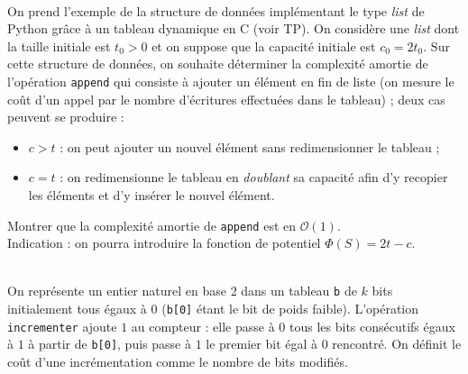 \documentclass[11pt,a4paper]{article}
\begin{document}
\begin{Exercise}[title={Un exemple de complexité amortie}]\\
On prend l'exemple de la structure de données implémentant le type \textit{list} de Python grâce à un tableau dynamique en C (voir TP). On considère une \textit{list} dont la taille initiale est $t_0 > 0$ et on suppose que la capacité initiale est $c_0 = 2t_0$. Sur cette structure de données, on souhaite déterminer la complexité amortie de l'opération {\tt append} qui consiste à ajouter un élément en fin de liste (on mesure le coût d'un appel par le nombre d'écritures effectuées dans le tableau) ; deux cas peuvent se produire :
\begin{itemize}
\item[\textbullet] $c > t$ : on peut ajouter un nouvel élément sans redimensionner le tableau ;
\item[\textbullet] $c = t$ : on redimensionne le tableau en \textit{doublant} sa capacité afin d'y recopier les éléments et d'y insérer le nouvel élément.
\end{itemize}
Montrer que la complexité amortie de {\tt append} est en $\mathcal{O}(1)$. \\
{\small \aide \;} Indication : on pourra introduire la fonction de potentiel $\Phi(S) = 2t - c$.
\end{Exercise}

\begin{Exercise}[title={Complexité amortie d'un compteur binaire}]\\
    On représente un entier naturel en base $2$ dans un tableau {\tt b} de $k$ bits initialement tous égaux à $0$ ({\tt b[0]} étant le bit de poids faible). L'opération {\tt incrementer} ajoute $1$ au compteur : elle passe à $0$ tous les bits consécutifs égaux à $1$ à partir de {\tt b[0]}, puis passe à $1$ le premier bit égal à $0$ rencontré. On définit le coût d'une incrémentation comme le nombre de bits modifiés.
\end{Exercise}
\end{document}
